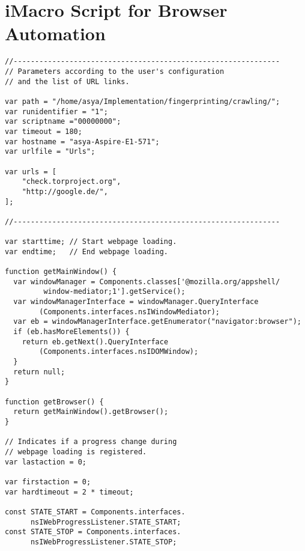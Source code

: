 \section{iMacro Script for Browser Automation}
\label{sec:imacro_script}



\begin{verbatim}
//--------------------------------------------------------------
// Parameters according to the user's configuration
// and the list of URL links. 

var path = "/home/asya/Implementation/fingerprinting/crawling/";
var runidentifier = "1";
var scriptname ="00000000";
var timeout = 180;
var hostname = "asya-Aspire-E1-571";
var urlfile = "Urls";

var urls = [
	"check.torproject.org",
	"http://google.de/",
];

//--------------------------------------------------------------

var starttime; // Start webpage loading.
var endtime;   // End webpage loading.

function getMainWindow() {
  var windowManager = Components.classes['@mozilla.org/appshell/
         window-mediator;1'].getService();
  var windowManagerInterface = windowManager.QueryInterface
        (Components.interfaces.nsIWindowMediator);
  var eb = windowManagerInterface.getEnumerator("navigator:browser");
  if (eb.hasMoreElements()) {
    return eb.getNext().QueryInterface
        (Components.interfaces.nsIDOMWindow);
  }
  return null;
}

function getBrowser() {
  return getMainWindow().getBrowser();
}

// Indicates if a progress change during
// webpage loading is registered.
var lastaction = 0;

var firstaction = 0;
var hardtimeout = 2 * timeout;

const STATE_START = Components.interfaces.
      nsIWebProgressListener.STATE_START;  
const STATE_STOP = Components.interfaces.
      nsIWebProgressListener.STATE_STOP;


\end{verbatim}
